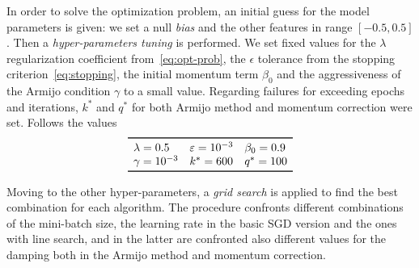 In order to solve the optimization problem, an initial guess for the model parameters is given: we set a null \emph{bias} and the other features in range $[-0.5,0.5]$. Then a \emph{hyper-parameters tuning} is performed. We set fixed values for the $\lambda$ regularization coefficient from~\eqref{eq:opt-prob}, the $\epsilon$ tolerance from the stopping criterion~\eqref{eq:stopping}, the initial momentum term $\beta_0$ and the aggressiveness of the Armijo condition $\gamma$ to a small value. Regarding failures for exceeding epochs and iterations, $k^\ast$ and $q^\ast$ for both Armijo method and momentum correction were set. Follows the values
\[
\begin{array}{lll}
\toprule
\lambda=0.5 & \epsilon=\num{e-3} & \beta_0=0.9 \\
\gamma=\num{e-3} & k^\ast=600 & q^\ast=100 \\
\bottomrule
\end{array}
\]

Moving to the other hyper-parameters, a \emph{grid search} is applied to find the best combination for each algorithm. The procedure confronts different combinations of the mini-batch size, the learning rate in the basic SGD version and the ones with line search, and in the latter are confronted also different values for the damping both in the Armijo method and momentum correction.

